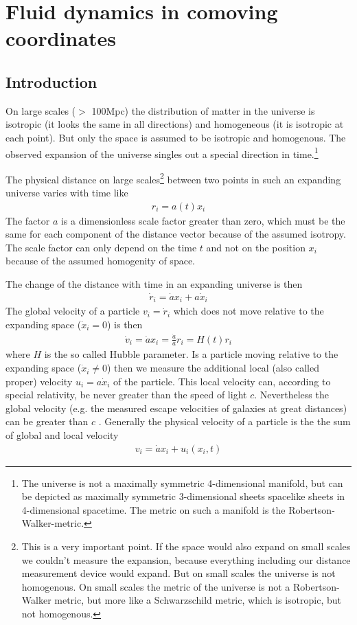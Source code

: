 \documentclass[a4paper,
					12pt,
					twoside,
					pagesize,
					cleardoubleplain,
					headsepline,
					bibtotoc
					]{scrbook}
\newcommand{\fh}{\frac{\dot{a}}{a}}
\begin{document}
\chapter{Fluid dynamics in comoving coordinates}
\section{Introduction}
On large scales ($>$ 100Mpc) the distribution of matter 
in the universe is isotropic (it looks the same in all directions) 
and homogeneous (it is isotropic at each point). But only the space 
is assumed to be isotropic and homogenous. The observed expansion of 
the universe singles out a special direction in time.\footnote{The 
universe is not a maximally symmetric 4-dimensional manifold, but can be 
depicted as maximally symmetric 3-dimensional sheets spacelike sheets 
in 4-dimensional spacetime. The metric on such a manifold is the 
Robertson-Walker-metric.}

The physical distance on large scales\footnote{This is a very important 
point. If the space would also
expand on small scales we couldn't measure the expansion, because everything 
including our distance measurement device would expand. But on small scales
the universe is not homogenous. On small scales the metric of the universe is 
not a Robertson-Walker metric, but more like a Schwarzschild metric, which
is isotropic, but not homogenous.} 
between two points in such an expanding universe varies with time like
\begin{align}
r_i=a(t) x_i
\end{align}
The factor $a$ is a dimensionless scale factor greater than zero, which must 
be the same for each component of the distance vector because of the assumed isotropy.
The scale factor can only depend on the time $t$ and not on the position
$x_i$ because of the assumed homogenity of space. 

The change of the distance with time in an expanding universe is then
\begin{align}
\dot{r}_i = \dot{a} x_i + a \dot{x}_i  
\end{align}
The global velocity of a particle $v_i = \dot{r}_i$ which does not move 
relative to the expanding space ($\dot{x}_i = 0$) is then
\begin{align}
\dot{v}_i = \dot{a} x_i = \fh r_i = H(t) r_i 
\end{align}
where $H$ is the so called Hubble parameter. Is a particle moving relative to
the expanding space ($\dot{x}_i \neq 0$) then we measure the additional 
local (also called proper) velocity $u_i = a \dot{x}_i$ of the particle. This local
velocity can, according to special relativity, be never greater than the speed of light
$c$. Nevertheless the global velocity (e.g. the measured escape velocities of galaxies at 
great distances) can be greater than $c$ \citep{Davis2004}. Generally the physical velocity 
of a particle is the the sum of global and local velocity
\begin{align}
v_i = \dot{a} x_i + u_i (x_i,t)
\end{align}
\end{document}
